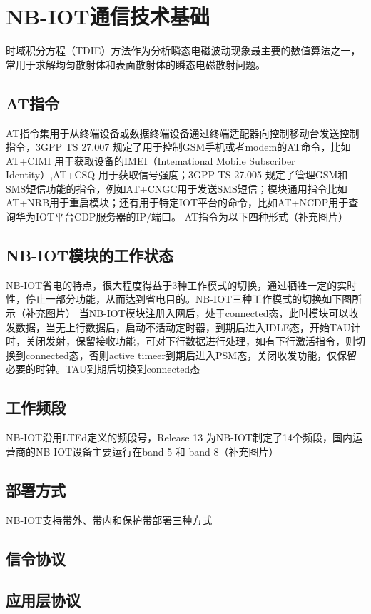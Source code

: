 \chapter{NB-IOT通信技术基础}
时域积分方程（TDIE）方法作为分析瞬态电磁波动现象最主要的数值算法之一，常用于求解均匀散射体和表面散射体的瞬态电磁散射问题。

\section{AT指令}
AT指令集用于从终端设备或数据终端设备通过终端适配器向控制移动台发送控制指令，3GPP TS 27.007 规定了用于控制GSM手机或者modem的AT命令，比如 AT+CIMI 用于获取设备的IMEI（Intemational Mobile Subscriber Identity）,AT+CSQ 用于获取信号强度；3GPP TS 27.005 规定了管理GSM和SMS短信功能的指令，例如AT+CNGC用于发送SMS短信；模块通用指令比如 AT+NRB用于重启模块；还有用于特定IOT平台的命令，比如AT+NCDP用于查询华为IOT平台CDP服务器的IP/端口。
AT指令为以下四种形式（补充图片）

\section{NB-IOT模块的工作状态}
NB-IOT省电的特点，很大程度得益于3种工作模式的切换，通过牺牲一定的实时性，停止一部分功能，从而达到省电目的。NB-IOT三种工作模式的切换如下图所示（补充图片）
当NB-IOT模块注册入网后，处于connected态，此时模块可以收发数据，当无上行数据后，启动不活动定时器，到期后进入IDLE态，开始TAU计时，关闭发射，保留接收功能，可对下行数据进行处理，如有下行激活指令，则切换到connected态，否则active timeer到期后进入PSM态，关闭收发功能，仅保留必要的时钟。TAU到期后切换到connected态

\section{工作频段}
NB-IOT沿用LTEd定义的频段号，Release 13 为NB-IOT制定了14个频段，国内运营商的NB-IOT设备主要运行在band 5 和 band 8（补充图片）

\section{部署方式}
NB-IOT支持带外、带内和保护带部署三种方式

\section{信令协议}

\section{应用层协议}

